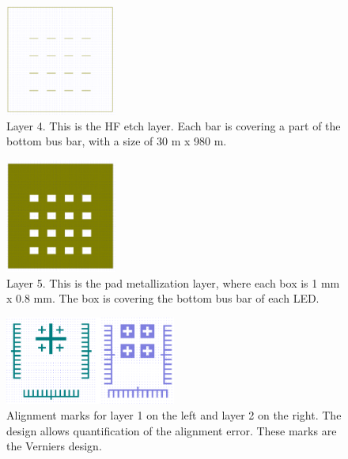 \begin{figure}[!h]
    \centering
    \includegraphics[width=0.325\textwidth]{figures/CleWin_L4.png}
    \caption{
        Layer 4. 
        This is the HF etch layer. 
        Each bar is covering a part of the bottom bus bar, with a size of 30 \textmu m x 980 \textmu m.
    }
    \label{fig:CleWin_L4}
\end{figure}


\begin{figure}[!h]
    \centering
    \includegraphics[width=0.325\textwidth]{figures/CleWin_L5.png}
    \caption{
        Layer 5. 
        This is the pad metallization layer, where each box is 1 mm x 0.8 mm. 
        The box is covering the bottom bus bar of each LED. 
    }
    \label{fig:CleWin_L5}
\end{figure}


\begin{figure}[!h]
    \centering
    \includegraphics[width=0.5\textwidth]{figures/CleWin_alignment_marks.png}
    \caption{
        Alignment marks for layer 1 on the left and layer 2 on the right. 
        The design allows quantification of the alignment error.
        These marks are the Verniers design. 
    }
    \label{fig:CleWin_alignment_marks}
\end{figure}



